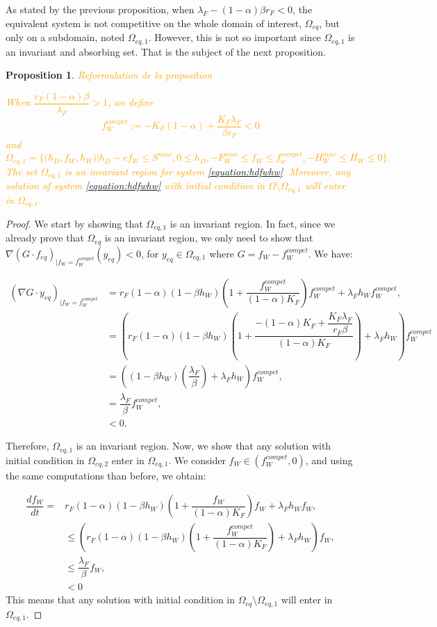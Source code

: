 \documentclass{article}
\newcommand{\lfw}{\lambda_{F}}
\newcommand{\lfw}{\lambda_{F}}
\newcommand{\vdeux}[1]{\textcolor{orange}{#1}}
\newtheorem{prop}[theorem]{Proposition}
\theoremstyle{definition}
\theoremstyle{remark}
\begin{document}
As stated by the previous proposition, when $\lfw - (1-\alpha)\beta r_F < 0$, the equivalent system is not competitive on the whole domain of interest, $\Omega_{eq}$, but only on a subdomain, noted $\Omega_{eq, 1}$. However, this is not so important since $\Omega_{eq, 1}$ is an invariant and absorbing set. That is the subject of the next proposition.


\begin{prop} \label{prop:absorbing set}
\vdeux{Reformulation de la proposition}

\vdeux{
When $\dfrac{r_F(1-\alpha) \beta}{\lfw} > 1$, we define 
$$
f_W^{compet} := -K_F(1-\alpha) + \dfrac{K_F \lfw}{\beta r_F} < 0
$$
and
$$
\Omega_{eq, 1} = \Big\{\Big(h_D, f_W, h_W \Big)  \Big|h_D - ef_W \leq S^{max}, 0 \leq h_D,  -F_W^{max} \leq f_W \leq f_w^{compet}, -H_W^{max}\leq  H_W \leq 0 \Big\}.
$$
The set $\Omega_{eq, 1}$ is an invariant region for system \eqref{equation:hdfwhw}. Moreover, any solution of system \eqref{equation:hdfwhw} with initial condition in $\Omega \setminus \Omega_{eq, 1}$ will enter in $\Omega_{eq, 1}$.}
\end{prop}

\begin{proof}
We start by showing that $\Omega_{eq, 1}$ is an invariant region. In fact, since we already prove that $\Omega_{eq}$ is an invariant region, we only need to show that 
$\nabla (G \cdot f_{eq})_{|f_W = f_W^{compet}}(y_{eq}) < 0$, for $y_{eq} \in \Omega_{eq, 1}$ where $G = f_W - f_W^{compet}$. We have:

\begin{align*}
(\nabla G \cdot y_{eq})_{|f_W = f_W^{compet}} &= r_F(1-\alpha)(1-\beta h_W) \left(1 + \dfrac{f_W^{compet}}{(1-\alpha) K_F} \right)f_W^{compet} + \lfw h_W f^{compet}_W, \\
&= \left(r_F(1-\alpha)(1-\beta h_W) \left(1 + \dfrac{-(1-\alpha) K_F + \dfrac{K_F \lfw}{r_F \beta}}{(1-\alpha) K_F}\right) + \lfw h_W \right) f^{compet}_W \\
&= \left((1-\beta h_W) \left( \dfrac{\lfw}{\beta}\right) + \lfw h_W \right) f^{compet}_W, \\
&= \dfrac{\lfw}{\beta} f_W^{compet}, \\
&< 0.
\end{align*}

Therefore, $\Omega_{eq, 1}$ is an invariant region. Now, we show that any solution with initial condition in $\Omega_{eq, 2}$ enter in $\Omega_{eq, 1}$. We consider $f_W \in (f_W^{compet}, 0)$, and using the same computations than before, we obtain:

\begin{align*}
\dfrac{df_W}{dt} = &r_F(1-\alpha)(1-\beta h_W) \left(1 + \dfrac{f_W}{(1-\alpha) K_F}\right)f_W + \lfw h_W  f_W, \\
& \leq \left(r_F(1-\alpha)(1-\beta h_W) \left(1 + \dfrac{f_W^{compet}}{(1-\alpha) K_F}\right) + \lfw h_W  \right) f_W, \\
& \leq \dfrac{\lfw}{\beta} f_W,\\
&< 0
\end{align*}
This means that any solution with initial condition in $\Omega_{eq} \setminus \Omega_{eq, 1}$ will enter in $\Omega_{eq, 1}$.
\end{proof}
\end{document}
